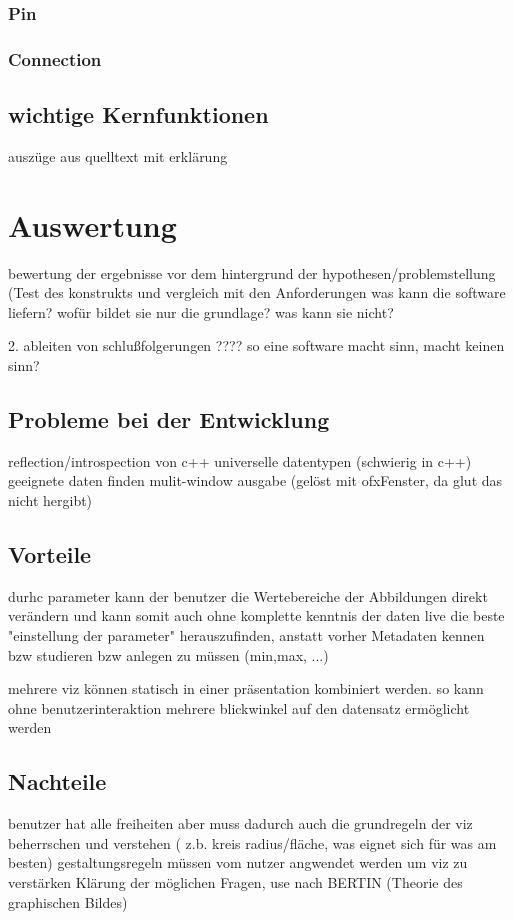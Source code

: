 \documentclass[a4paper, 12pt, DIVcalc, onepage, pdftex, headsepline, footsepline]{scrreprt}
\begin{document}
\subsection{Pin}
\subsection{Connection}
\section{wichtige Kernfunktionen}
\label{sec:Kernfunktionen}
auszüge aus quelltext mit erklärung
\chapter{Auswertung}
\label{cha:Auswertung}
bewertung der ergebnisse vor dem hintergrund der hypothesen/problemstellung (Test des konstrukts und vergleich mit den Anforderungen
was kann die software liefern? wofür bildet sie nur die grundlage? was kann sie nicht?

2. ableiten von schlußfolgerungen
????
so eine software macht sinn, macht keinen sinn?
\section{Probleme bei der Entwicklung}
\label{sec:Probleme}
reflection/introspection von c++
universelle datentypen (schwierig in c++)
geeignete daten finden
mulit-window ausgabe (gelöst mit ofxFenster, da glut das nicht hergibt)
\section{Vorteile}
\label{sec:Vorteile}
durhc parameter kann der benutzer die Wertebereiche der Abbildungen direkt verändern und kann somit auch ohne komplette kenntnis der daten live die beste "einstellung der parameter" herauszufinden, anstatt vorher Metadaten kennen bzw studieren bzw anlegen zu müssen (min,max, ...)

mehrere viz können statisch in einer präsentation kombiniert werden. so kann ohne benutzerinteraktion mehrere blickwinkel auf den datensatz ermöglicht werden

\section{Nachteile}
\label{sec:Nachteile}
benutzer hat alle freiheiten aber muss dadurch auch die grundregeln der viz beherrschen und verstehen ( z.b. kreis radius/fläche, was eignet sich für was am besten)
gestaltungsregeln müssen vom nutzer angwendet werden um viz zu verstärken
Klärung der möglichen Fragen, use nach BERTIN (Theorie des graphischen Bildes)
\end{document}
